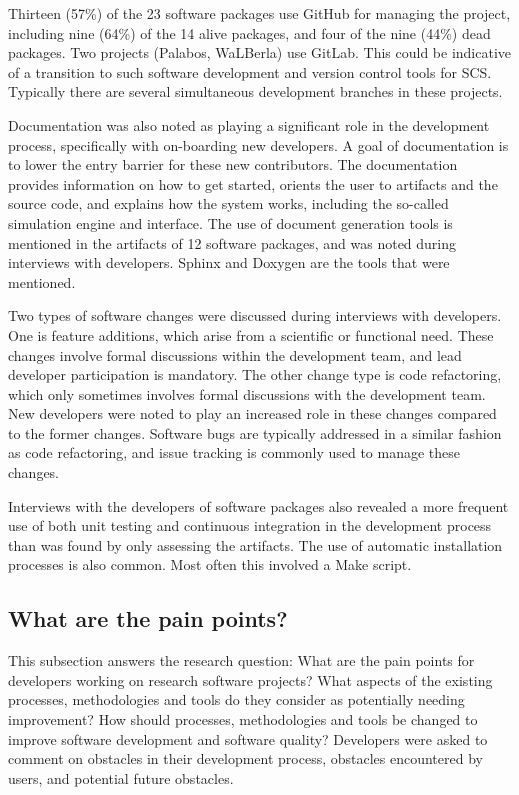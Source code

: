 \documentclass[final, 3p, times, authoryear]{elsarticle}
\begin{document}
Thirteen (57\%) of the 23 software packages use GitHub for managing the project,
including nine (64\%) of the 14 alive packages, and four of the nine (44\%) dead
packages. Two projects (Palabos, WaLBerla) use GitLab. This could be indicative
of a transition to such software development and version control tools for SCS.
Typically there are several simultaneous development branches in these projects.

Documentation was also noted as playing a significant role in the development
process, specifically with on-boarding new developers. A goal of documentation
is to lower the entry barrier for these new contributors. The documentation
provides information on how to get started, orients the user to artifacts and
the source code, and explains how the system works, including the so-called
simulation engine and interface. The use of document generation tools is
mentioned in the artifacts of 12 software packages, and was noted during
interviews with developers. Sphinx and Doxygen are the tools that were
mentioned. 

Two types of software changes were discussed during interviews with developers.
One is feature additions, which arise from a scientific or functional need.
These changes involve formal discussions within the development team, and lead
developer participation is mandatory. The other change type is code refactoring,
which only sometimes involves formal discussions with the development team. New
developers were noted to play an increased role in these changes compared to the
former changes. Software bugs are typically addressed in a similar fashion as
code refactoring, and issue tracking is commonly used to manage these changes. 

Interviews with the developers of software packages also revealed a more
frequent use of both unit testing and continuous integration in the development
process than was found by only assessing the artifacts. The use of automatic
installation processes is also common. Most often this involved a Make script.

\subsection{What are the pain points?} \label{painpoints}

This subsection answers the research question: What are the pain points for
developers working on research software projects? What aspects of the existing
processes, methodologies and tools do they consider as potentially needing
improvement? How should processes, methodologies and tools be changed to improve
software development and software quality?  Developers were asked to comment on
obstacles in their development process, obstacles encountered by users, and
potential future obstacles.
\end{document}
